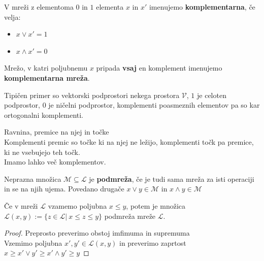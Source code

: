 \documentclass{beamer}
\begin{document}
\begin{frame}
\begin{definition}
V mreži z elementoma $0$ in $1$ elementa $x$ in $x'$ imenujemo \textbf{komplementarna}, če velja:
\begin{itemize}
\item $x \lor x' = 1$
\item $x \land x' = 0$
\end{itemize}
\end{definition}

\begin{definition}
Mrežo, v katri poljubnemu $x$ pripada \textbf{vsaj} en komplement imenujemo \textbf{komplementarna mreža}.
\end{definition}

\end{frame}

\begin{frame}
\begin{example}
Tipičen primer so vektorski podprostori nekega prostora $\mathcal{V}$, $1$ je celoten podprostor, $0$ je ničelni podprostor, komplementi poasmeznih elementov pa so kar ortogonalni komplementi.
\end{example}

\begin{example}
Ravnina, premice na njej in točke\\
Komplementi premic so točke ki na njej ne ležijo, komplementi točk pa premice, ki ne vsebujejo teh točk.\\
Imamo lahko več komplementov.
\end{example}

\end{frame}

\begin{frame}
\begin{definition}
Neprazna množica $\mathcal{M} \subseteq \mathcal{L}$ je \textbf{podmreža}, če je tudi sama mreža za isti operaciji in se na njih ujema. Povedano drugače $x \lor y \in \mathcal{M}$ in $x \land y \in \mathcal{M}$
\end{definition}
\end{frame}

\begin{frame}
\begin{theorem}
Če v mreži $\mathcal{L}$ vzamemo poljubna $x \leq y$, potem je množica $\mathcal{L}(x,y) := \{ z \in \mathcal{L} | \ x \leq z \leq y \}$ podmreža mreže $\mathcal{L}$.
\end{theorem}

\begin{proof}
Preprosto preverimo obstoj imfimuma in supremuma\\ \pause
Vzemimo poljubna $x',y' \in \mathcal{L}(x,y)$ in preverimo zaprtost\\ \pause $x \geq x' \lor y' \geq x' \land y' \geq y$
\end{proof}

\end{frame}
\end{document}
